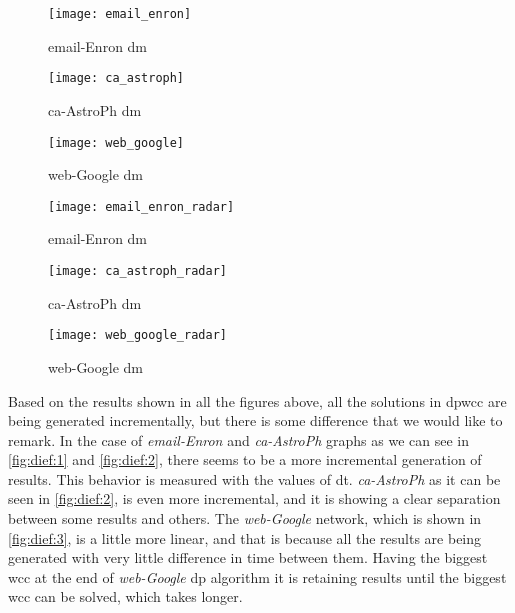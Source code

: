 \begin{figure}[!htb]
    \centering
    \begin{minipage}{0.33\textwidth}
     \texttt{[image: email\_enron]}
      \caption[\acrshort{dm} Results: email-Enron]{email-Enron \acrshort{dm}}
      \label{fig:dief:1}
    \end{minipage}%
    \begin{minipage}{0.33\textwidth}
     \texttt{[image: ca\_astroph]}
      \caption[\acrshort{dm} Results: ca-AstroPh]{ca-AstroPh \acrshort{dm}}
      \label{fig:dief:2}
    \end{minipage}%
    \begin{minipage}{0.33\textwidth}
     \texttt{[image: web\_google]}
      \caption[\acrshort{dm} Results: web-Google]{web-Google \acrshort{dm}}
      \label{fig:dief:3}
    \end{minipage}
\end{figure}

\begin{figure}[!htb]
  \centering
  \begin{minipage}{0.33\textwidth}
   \texttt{[image: email\_enron\_radar]}
    \caption[\acrshort{dm} Results: email-Enron radar]{email-Enron \acrshort{dm}}
    \label{fig:dief:rad:1}
  \end{minipage}%
  \begin{minipage}{0.33\textwidth}
   \texttt{[image: ca\_astroph\_radar]}
    \caption[\acrshort{dm} Results: ca-AstroPh radar]{ca-AstroPh \acrshort{dm}}
    \label{fig:dief:rad:2}
  \end{minipage}%
  \begin{minipage}{0.33\textwidth}
   \texttt{[image: web\_google\_radar]}
    \caption[\acrshort{dm} Results: web-Google radar]{web-Google \acrshort{dm}}
    \label{fig:dief:rad:3}
  \end{minipage}
\end{figure}

Based on the results shown in all the figures above, all the solutions in \acrshort{dpwcc} are being generated incrementally, 
but there is some difference that we would like to remark. In the case of \emph{email-Enron} and \emph{ca-AstroPh} graphs 
as we can see in \autoref{fig:dief:1} and \autoref{fig:dief:2}, there seems to be a more incremental generation of results. 
This behavior is measured with the values of \acrfull{dt}. \emph{ca-AstroPh} as it can be seen in \autoref{fig:dief:2}, is even more incremental, and it is showing a clear separation between some results and others. 
The \emph{web-Google} network, which is shown in \autoref{fig:dief:3}, is a little more linear, and that is because all the results are being generated with very little difference in time between them. 
Having the biggest \acrshort{wcc} at the end of \emph{web-Google} \acrshort{dp} algorithm 
it is retaining results until the biggest \acrshort{wcc} can be solved, which takes longer. 


